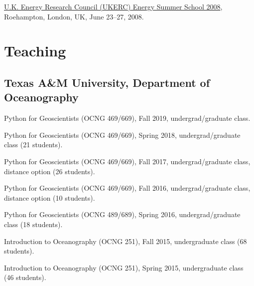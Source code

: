 \documentclass[10pt,letterpaper]{article}
\renewenvironment{itemize}{
  \begin{list}{}{
    \setlength{\leftmargin}{1.5em}
    \setlength{\itemsep}{0.25em}
    \setlength{\parskip}{0pt}
    \setlength{\parsep}{0.25em}
  }
}{
  \end{list}
}
\begin{document}
\begin{itemize}


\item \href{http://www.ukerc.ac.uk/support/tiki-index.php?page=0608UKERCSummerSchool}{U.K. Energy Research Council (UKERC) Energy Summer School 2008},
  Roehampton, London, UK,
  June 23--27, 2008.

\end{itemize}

\section*{Teaching}

\subsection*{Texas A\&M University, Department of Oceanography}

\begin{itemize}
\item Python for Geoscientists (OCNG 469/669), Fall 2019, undergrad/graduate class.
\item Python for Geoscientists (OCNG 469/669), Spring 2018, undergrad/graduate class (21 students).
\item Python for Geoscientists (OCNG 469/669), Fall 2017, undergrad/graduate class, distance option (26 students).
\item Python for Geoscientists (OCNG 469/669), Fall 2016, undergrad/graduate class, distance option (10 students).
\item Python for Geoscientists (OCNG 489/689), Spring 2016, undergrad/graduate class (18 students).
\item Introduction to Oceanography (OCNG 251), Fall 2015, undergraduate class (68 students).
\item Introduction to Oceanography (OCNG 251), Spring 2015, undergraduate class (46 students).

\end{itemize}
\end{document}
